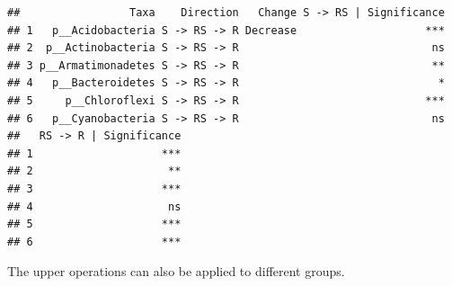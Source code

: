 \documentclass[
]{book}
\newenvironment{Shaded}{\begin{snugshade}}{\end{snugshade}}
\newcommand{\FunctionTok}[1]{\textcolor[rgb]{0.00,0.00,0.00}{#1}}
\newcommand{\NormalTok}[1]{#1}
\newcommand{\SpecialCharTok}[1]{\textcolor[rgb]{0.00,0.00,0.00}{#1}}
\begin{document}
\begin{Shaded}
\end{Shaded}

\begin{verbatim}
##                 Taxa    Direction   Change S -> RS | Significance
## 1   p__Acidobacteria S -> RS -> R Decrease                    ***
## 2  p__Actinobacteria S -> RS -> R                              ns
## 3 p__Armatimonadetes S -> RS -> R                              **
## 4   p__Bacteroidetes S -> RS -> R                               *
## 5     p__Chloroflexi S -> RS -> R                             ***
## 6   p__Cyanobacteria S -> RS -> R                              ns
##   RS -> R | Significance
## 1                    ***
## 2                     **
## 3                    ***
## 4                     ns
## 5                    ***
## 6                    ***
\end{verbatim}

The upper operations can also be applied to different groups.
\end{document}
